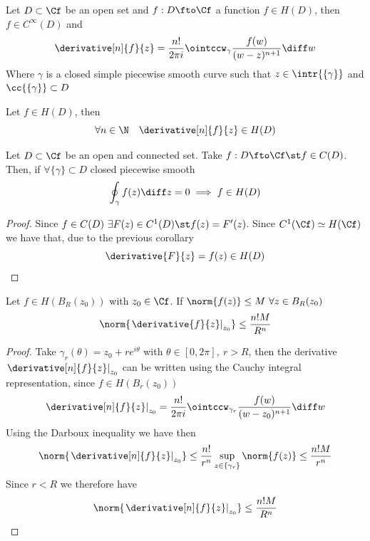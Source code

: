 \documentclass[../mmf.tex]{subfiles}
\begin{document}
\begin{thm}
	Let $D\subset\Cf$ be an open set and $f:D\fto\Cf$ a function $f\in H(D)$, then $f\in C^{\infty}(D)$ and
	\begin{equation}
		\derivative[n]{f}{z}=\frac{n!}{2\pi i}\ointccw_{\gamma}\frac{f(w)}{(w-z)^{n+1}}\diff w
		\label{eq:derivativeintrep}
	\end{equation}
	Where $\gamma$ is a closed simple piecewise smooth curve such that $z\in\intr{\{\gamma\}}$ and $\cc{\{\gamma\}}\subset D$
\end{thm}
\begin{cor}
	Let $f\in H(D)$, then
	\begin{equation*}
		\forall n\in\N\quad\derivative[n]{f}{z}\in H(D)
	\end{equation*}
\end{cor}
\begin{thm}[Morera]
	Let $D\subset\Cf$ be an open and connected set. Take $f:D\fto\Cf\st f\in C(D)$. Then, if $\forall\{\gamma\}\subset D$ closed piecewise smooth
	\begin{equation}
		\oint_\gamma f(z)\diff z=0\implies{} f\in H(D)
		\label{eq:morera}
	\end{equation}
\end{thm}
\begin{proof}
	Since $f\in C(D)\ \exists F(z)\in C^1(D)\st f(z)=F'(z)$. Since $C^1(\Cf)\simeq H(\Cf)$ we have that, due to the previous corollary
	\begin{equation*}
		\derivative{F}{z}=f(z)\in H(D)
	\end{equation*}
\end{proof}
\begin{thm}
	Let $f\in H(B_R(z_0))$ with $z_0\in\Cf$. If $\norm{f(z)}\le M\ \forall z\in B_R(z_0)$
	\begin{equation}
		\norm{\left.\derivative{f}{z}\right|_{z_0}}\le\frac{n!M}{R^n}
			\label{eq:cauchyineq}
		\end{equation}
	\end{thm}
	\begin{proof}
		Take $\gamma_r(\theta)=z_0+re^{i\theta}$ with $\theta\in[0,2\pi],\ r>R$, then the derivative $\left.\derivative[n]{f}{z}\right|_{z_0}$ can be written using the Cauchy integral representation, since $f\in H(B_r(z_0))$
			\begin{equation*}
				\left.\derivative[n]{f}{z}\right|_{z_0}=\frac{n!}{2\pi i}\ointccw_{\gamma_r}\frac{f(w)}{(w-z_0)^{n+1}}\diff w
				\end{equation*}
				Using the Darboux inequality we have then
				\begin{equation*}
					\norm{\left.\derivative[n]{f}{z}\right|_{z_0}}\le\frac{n!}{r^n}\sup_{z\in\{\gamma_r\}}\norm{f(z)}\le\frac{n!M}{r^n}
					\end{equation*}
					Since $r<R$ we therefore have
					\begin{equation*}
						\norm{\left.\derivative[n]{f}{z}\right|_{z_0}}\le\frac{n!M}{R^n}
						\end{equation*}
					\end{proof}
\end{document}
